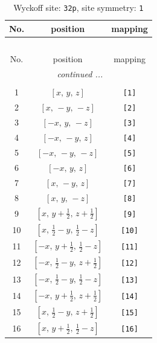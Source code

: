 \documentclass[fleqn,8pt]{jsarticle}
\begin{document}
\renewcommand{\arraystretch}{1.2}
\begin{longtable}{ccc}
\caption{Wyckoff site: {\tt 32p}, site symmetry: {\tt 1}}
 \\
 \hline \hline
No. & position & mapping \\ \hline \endfirsthead

\multicolumn{2}{l}{\tablename\ \thetable{}} \\
 \hline \hline
No. & position & mapping \\ \hline \endhead

 \hline \hline
\multicolumn{2}{r}{\footnotesize\it continued ...} \\ \endfoot

 \hline \hline
\multicolumn{2}{r}{} \\ \endlastfoot

1 & $\left[ x,\, y,\, z \right]$ & {\tt [1]} \\ \hline
2 & $\left[ x,\, - y,\, - z \right]$ & {\tt [2]} \\ \hline
3 & $\left[ - x,\, y,\, - z \right]$ & {\tt [3]} \\ \hline
4 & $\left[ - x,\, - y,\, z \right]$ & {\tt [4]} \\ \hline
5 & $\left[ - x,\, - y,\, - z \right]$ & {\tt [5]} \\ \hline
6 & $\left[ - x,\, y,\, z \right]$ & {\tt [6]} \\ \hline
7 & $\left[ x,\, - y,\, z \right]$ & {\tt [7]} \\ \hline
8 & $\left[ x,\, y,\, - z \right]$ & {\tt [8]} \\ \hline
9 & $\left[ x,\, y + \frac{1}{2},\, z + \frac{1}{2} \right]$ & {\tt [9]} \\ \hline
10 & $\left[ x,\, \frac{1}{2} - y,\, \frac{1}{2} - z \right]$ & {\tt [10]} \\ \hline
11 & $\left[ - x,\, y + \frac{1}{2},\, \frac{1}{2} - z \right]$ & {\tt [11]} \\ \hline
12 & $\left[ - x,\, \frac{1}{2} - y,\, z + \frac{1}{2} \right]$ & {\tt [12]} \\ \hline
13 & $\left[ - x,\, \frac{1}{2} - y,\, \frac{1}{2} - z \right]$ & {\tt [13]} \\ \hline
14 & $\left[ - x,\, y + \frac{1}{2},\, z + \frac{1}{2} \right]$ & {\tt [14]} \\ \hline
15 & $\left[ x,\, \frac{1}{2} - y,\, z + \frac{1}{2} \right]$ & {\tt [15]} \\ \hline
16 & $\left[ x,\, y + \frac{1}{2},\, \frac{1}{2} - z \right]$ & {\tt [16]} \\ \hline

\end{longtable}
\end{document}
